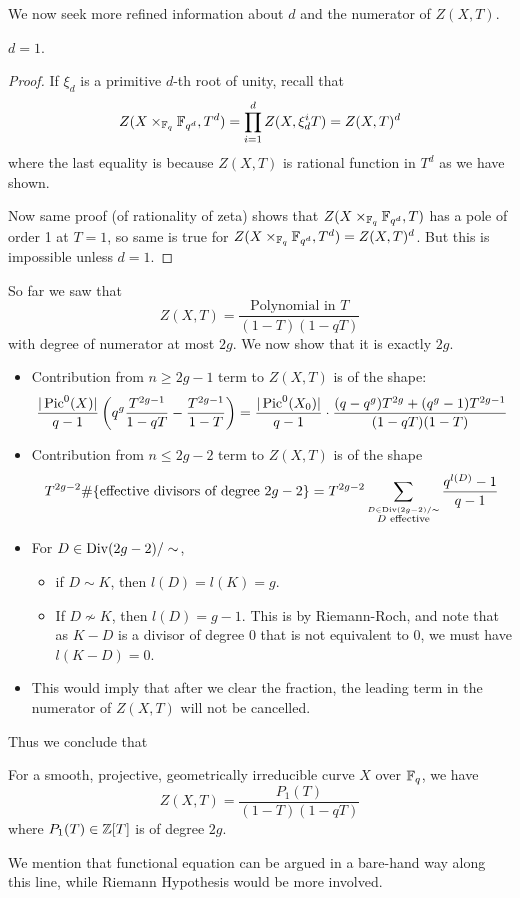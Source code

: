 We now seek more refined information about $d$ and the numerator of $Z(X,T)$.
\begin{claim}
$d = 1$.
\end{claim}
\begin{proof}
If $\xi_d$ is a primitive $d$-th root of unity, recall that
\[
Z(X \times_{\mathbb{F}_q} \mathbb{F}_{q^d}, T^d) = \prod_{i=1}^d Z(X, \xi_d^i T) = Z(X,T)^d
\]
where the last equality is because $Z(X,T)$ is rational function in $T^d$ as we have shown.

Now same proof (of rationality of zeta) shows that $Z(X \times_{\mathbb{F}_q} \mathbb{F}_{q^d},T)$ has a pole of order 1 at $T = 1$, so same is true for $Z(X \times_{\mathbb{F}_q} \mathbb{F}_{q^d},T^d) = Z(X,T)^d$. But this is impossible unless $d = 1$.
\end{proof}
So far we saw that 
\[
Z(X,T) = \frac{\text{Polynomial in $T$}}{(1-T)(1-qT)}
\]
with degree of numerator at most $2g$. We now show that it is exactly $2g$.
\begin{itemize}
    \item Contribution from $n \ge 2g-1$ term to $Z(X,T)$ is of the shape:
    \[
    \frac{|\operatorname{Pic}^0(X)|}{q-1} \left(q^{g} \frac{T^{2g-1}}{1-qT} - \frac{T^{2g-1}}{1-T}\right) = \frac{|\operatorname{Pic}^0(X_0)|}{q-1} \cdot \frac{(q-q^g)T^{2g} + (q^g - 1)T^{2g-1}}{(1-qT)(1-T)}
    \]
    \item Contribution from $n \leq 2g-2$ term to $Z(X,T)$ is of the shape
    \[
    T^{2g-2} \#\{\text{effective divisors of degree $2g-2$}\} = T^{2g-2} \sum_{{\stackrel{D \in \operatorname{Div}(2g-2)/\sim}{D \text{ effective}}}} \frac{q^{l(D)} - 1}{q-1}
    \]
    \item For $D \in \operatorname{Div}(2g-2)/\sim$,
    \begin{itemize}
        \item if $D \sim K$, then $l(D) = l(K) = g$.
        \item If $D \not\sim K$, then $l(D) = g-1$. This is by Riemann-Roch, and note that as $K-D$ is a divisor of degree 0 that is not equivalent to 0, we must have $l(K-D) = 0$.
    \end{itemize}
    \item This would imply that after we clear the fraction, the leading term in the numerator of $Z(X,T)$ will not be cancelled.
\end{itemize}
Thus we conclude that
\begin{thm} For a smooth, projective, geometrically irreducible curve $X$ over $\mathbb{F}_q$, we have
\[
Z(X,T) = \frac{P_1(T)}{(1-T)(1-qT)}
\]
where $P_1(T) \in \mathbb{Z}[T]$ is of degree $2g$.
\end{thm}
We mention that functional equation can be argued in a bare-hand way along this line, while Riemann Hypothesis would be more involved.

